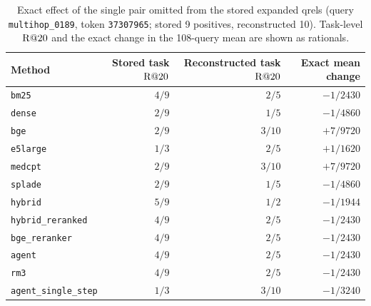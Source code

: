 \begin{table}[h]
\centering
\small
\caption{Exact effect of the single pair omitted from the stored expanded qrels (query \texttt{multihop\_0189}, token \texttt{37307965}; stored 9 positives, reconstructed 10). Task-level $\mathrm{R}@20$ and the exact change in the 108-query mean are shown as rationals.}
\label{tab:missingpair}
\begin{tabular}{@{}lrrr@{}}
\toprule
Method & Stored task $\mathrm{R}@20$ & Reconstructed task $\mathrm{R}@20$ & Exact mean change \\
\midrule
\texttt{bm25} & $4/9$ & $2/5$ & $-1/2430$ \\
\texttt{dense} & $2/9$ & $1/5$ & $-1/4860$ \\
\texttt{bge} & $2/9$ & $3/10$ & $+7/9720$ \\
\texttt{e5large} & $1/3$ & $2/5$ & $+1/1620$ \\
\texttt{medcpt} & $2/9$ & $3/10$ & $+7/9720$ \\
\texttt{splade} & $2/9$ & $1/5$ & $-1/4860$ \\
\texttt{hybrid} & $5/9$ & $1/2$ & $-1/1944$ \\
\texttt{hybrid\_reranked} & $4/9$ & $2/5$ & $-1/2430$ \\
\texttt{bge\_reranker} & $4/9$ & $2/5$ & $-1/2430$ \\
\texttt{agent} & $4/9$ & $2/5$ & $-1/2430$ \\
\texttt{rm3} & $4/9$ & $2/5$ & $-1/2430$ \\
\texttt{agent\_single\_step} & $1/3$ & $3/10$ & $-1/3240$ \\
\bottomrule
\end{tabular}
\end{table}

